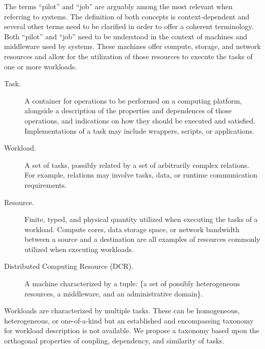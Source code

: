 \documentclass{sig-alternate}
\begin{document}
The terms ``pilot'' and ``job'' are arguably among the most relevant when
referring to \pilotjob systems. The definition of both concepts is
context-dependent and several other terms need to be clarified in order to offer
a coherent terminology. Both ``pilot'' and ``job'' need to be understood in the
context of machines and middleware used by \pilotjob systems. These machines
offer compute, storage, and network resources and \pilots allow for the
utilization of those resources to execute the tasks of one or more workloads.

\begin{description}

\item[Task.] A container for operations to be performed on a computing platform,
alongside a description of the properties and dependences of those operations,
and indications on how they should be executed and satisfied. Implementations of
a task may include wrappers, scripts, or applications.

\item[Workload.] A set of tasks, possibly related by a set of arbitrarily
complex relations. For example, relations may involve tasks, data, or runtime
communication requirements.

\item[Resource.] Finite, typed, and physical quantity utilized when executing
the tasks of a workload. Compute cores, data storage space, or network bandwidth
between a source and a destination are all examples of resources commonly
utilized when executing workloads.

\item[Distributed Computing Resource (DCR).] A machine characterized by a tuple:
\{a set of possibly heterogeneous resources, a middleware, and an administrative
domain\}.


\end{description}


Workloads are characterized by multiple tasks. These can be homogeneous,
heterogeneous, or one-of-a-kind but an established and encompassing taxonomy for
workload description is not available. We propose a taxonomy based upon the
orthogonal properties of coupling, dependency, and similarity of tasks.
\end{document}
